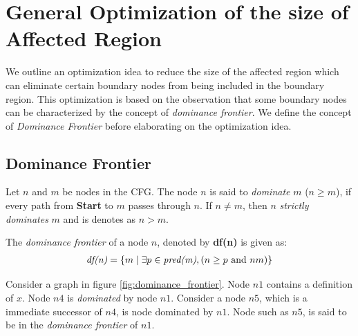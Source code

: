 \documentclass[11pt,a4paper,openright]{report}
\begin{document}
\section{General Optimization of the size of Affected Region}
We outline an optimization idea to reduce the size of the affected region which can 
eliminate certain boundary nodes from being included in the boundary region.
This optimization is based on the observation that some boundary nodes can be characterized
by the concept of \emph{dominance frontier}. We define the concept of \textit{Dominance Frontier} before elaborating on the optimization idea.

\subsection*{Dominance Frontier}

Let $n$ and $m$ be nodes in the CFG. The node $n$ is said to \textit{dominate} $m$ ($n\geq m$), if every path from \textbf{Start} to $m$ passes through $n$.
If $n \neq m$, then $n$ \textit{strictly dominates} $m$ and is denotes as $n > m$.  

The \textit{dominance frontier} of a node $n$, denoted by \textbf{df(n)} is given as:
\begin{equation}
\begin{split}
\mbox{\textit{df(n)}} &= \{ m \mid \exists p \in \textit{pred(m)}, ( n \geq p \mbox{ and } n  m )\} \\	  
\end{split} 
\end{equation}

Consider a graph in figure \ref{fig:dominance_frontier}. Node $n1$ contains a definition of $x$. Node $n4$ is \textit{dominated} by node $n1$. Consider a node $n5$, which is a 
immediate successor of $n4$, is node dominated by $n1$. Node such as $n5$, is said to be in the \textit{dominance frontier} of $n1$. 
\end{document}
